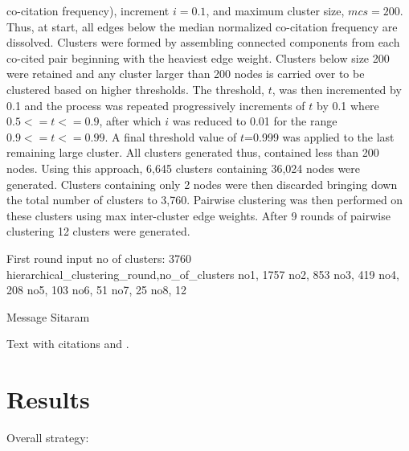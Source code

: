 co-citation frequency), increment $i = 0.1$, and maximum cluster size, $mcs = 200$. Thus, at start, all edges below the median normalized co-citation frequency are dissolved. Clusters were formed by assembling connected components from each co-cited pair beginning with the heaviest edge weight. Clusters below size 200 were retained and any cluster larger than 200 nodes is carried over to be clustered based on higher thresholds. The threshold, $t$, was then incremented by 0.1 and the process was repeated progressively increments of $t$ by 0.1 where $0.5 <= t <= 0.9$, after which $i$ was reduced to 0.01 for the range $0.9 <= t <= 0.99$. A final threshold value of $t$=0.999 was applied to the last remaining large cluster. All clusters generated thus, contained  less than 200 nodes.  Using this approach, 6,645 clusters containing 36,024 nodes were generated. Clusters containing only 2 nodes were then discarded bringing down the total number of clusters to 3,760. Pairwise clustering was then performed on these clusters using max inter-cluster edge weights. After 9 rounds of pairwise clustering 12 clusters were generated. 

First round input no of clusters: 3760
hierarchical\_clustering\_round,no\_of\_clusters
no1, 1757
no2, 853
no3, 419
no4, 208
no5, 103
no6, 51
no7, 25
no8, 12




Message Sitaram



\label{sec:1}
Text with citations \cite{RefB} and \cite{RefJ}.

\section{Results}
\label{sec:2}

Overall strategy:

